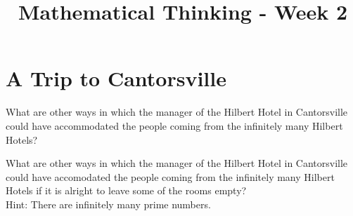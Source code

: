 \documentclass[12pt]{exam}
\title{Mathematical Thinking - Week 2}
\begin{document}
\maketitle
\tableofcontents
\section{A Trip to Cantorsville}
\begin{questions}
    \question What are other ways in which the manager of the Hilbert Hotel in Cantorsville could have accommodated the people coming from the infinitely many Hilbert Hotels?

    \question What are other ways in which the manager of the Hilbert Hotel in Cantorsville could have accomodated the people coming from the infinitely many Hilbert Hotels if it is alright to leave some of the rooms empty?\\
    Hint: There are infinitely many prime numbers.
\end{questions}
\end{document}
